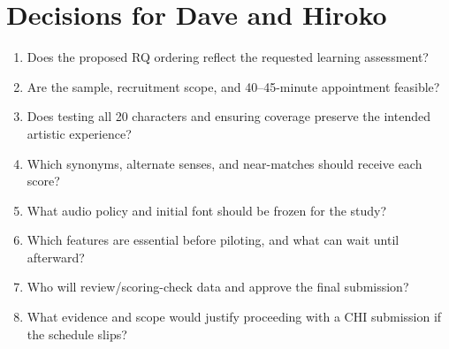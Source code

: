 \documentclass[11pt,letterpaper]{article}
\begin{document}
\section{Decisions for Dave and Hiroko}
\begin{enumerate}
\item Does the proposed RQ ordering reflect the requested learning assessment?
\item Are the sample, recruitment scope, and 40--45-minute appointment feasible?
\item Does testing all 20 characters and ensuring coverage preserve the intended artistic experience?
\item Which synonyms, alternate senses, and near-matches should receive each score?
\item What audio policy and initial font should be frozen for the study?
\item Which features are essential before piloting, and what can wait until afterward?
\item Who will review/scoring-check data and approve the final submission?
\item What evidence and scope would justify proceeding with a CHI submission if the schedule slips?
\end{enumerate}

\appendix
\newpage
\end{document}
